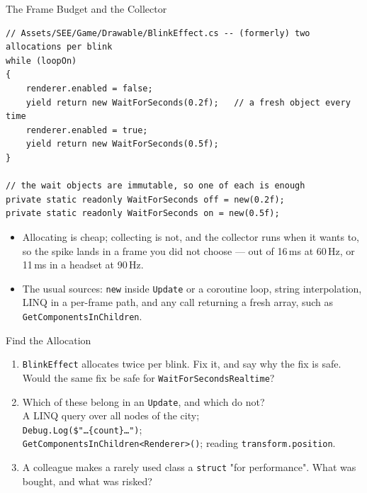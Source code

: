 \begin{frame}[fragile]{The Frame Budget and the Collector}
  \begin{lstlisting}[basicstyle=\scriptsize\ttfamily]
// Assets/SEE/Game/Drawable/BlinkEffect.cs -- (formerly) two allocations per blink
while (loopOn)
{
    renderer.enabled = false;
    yield return new WaitForSeconds(0.2f);   // a fresh object every time
    renderer.enabled = true;
    yield return new WaitForSeconds(0.5f);
}

// the wait objects are immutable, so one of each is enough
private static readonly WaitForSeconds off = new(0.2f);
private static readonly WaitForSeconds on = new(0.5f);
  \end{lstlisting}
  \vspace{1ex}

  \begin{itemize}
    \item Allocating is cheap; collecting is not, and the collector runs when
      it wants to, so the spike lands in a frame you did not choose --- out of
      16\,ms at 60\,Hz, or 11\,ms in a headset at 90\,Hz.
    \item The usual sources: \texttt{new} inside \texttt{Update} or a coroutine
      loop, string interpolation, LINQ in a per-frame path, and any call
      returning a fresh array, such as \texttt{GetComponentsInChildren}.
  \end{itemize}
\end{frame}

\begin{exerciseframe}{Find the Allocation}
  \begin{enumerate}
    \item \texttt{BlinkEffect} allocates twice per blink. Fix it, and say why
      the fix is safe. Would the same fix be safe for
      \texttt{WaitForSecondsRealtime}?
    \item Which of these belong in an \texttt{Update}, and which do not?\\
      A LINQ query over all nodes of the city;\\
      \texttt{Debug.Log(\$"\ldots\{count\}\ldots")};\\
      \texttt{GetComponentsInChildren<Renderer>()};
      reading \texttt{transform.position}.
    \item A colleague makes a rarely used class a \texttt{struct} "for
      performance". What was bought, and what was risked?
  \end{enumerate}
  \vspace{1ex}

\end{exerciseframe}

